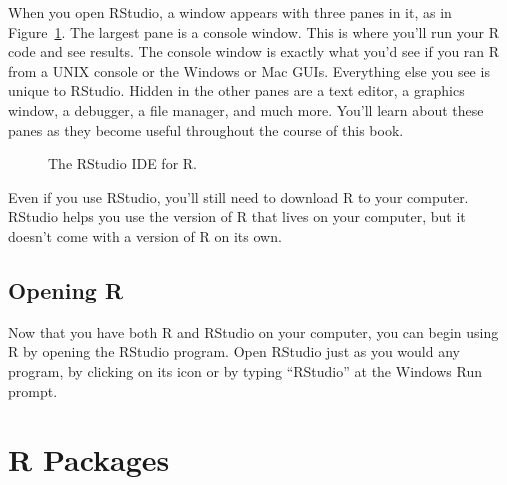 \documentclass[
  letterpaper,
  DIV=11,
  numbers=noendperiod]{scrbook}
\makeatletter
\newcommand*\pandocbounded[1]{%
  \sbox\pandoc@box{#1}%
  \Gscale@div\@tempa{\textheight}{\dimexpr\ht\pandoc@box+\dp\pandoc@box\relax}%
  \Gscale@div\@tempb{\linewidth}{\wd\pandoc@box}%
  \ifdim\@tempb\p@<\@tempa\p@\let\@tempa\@tempb\fi%
  \ifdim\@tempa\p@<\p@\scalebox{\@tempa}{\usebox\pandoc@box}%
  \else\usebox{\pandoc@box}%
  \fi%
}
\makeatother
\begin{document}
When you open RStudio, a window appears with three panes in it, as in
Figure~\ref{fig-layout}. The largest pane is a console window. This is
where you'll run your R code and see results. The console window is
exactly what you'd see if you ran R from a UNIX console or the Windows
or Mac GUIs. Everything else you see is unique to RStudio. Hidden in the
other panes are a text editor, a graphics window, a debugger, a file
manager, and much more. You'll learn about these panes as they become
useful throughout the course of this book.

\begin{figure}

\centering{

\pandocbounded{\texttt{[image: images/hopr\_aa01.png]}}

}

\caption{\label{fig-layout}The RStudio IDE for R.}

\end{figure}%

\begin{tcolorbox}[enhanced jigsaw, breakable, colback=white, colbacktitle=quarto-callout-tip-color!10!white, arc=.35mm, bottomrule=.15mm, coltitle=black, left=2mm, rightrule=.15mm, colframe=quarto-callout-tip-color-frame, leftrule=.75mm, opacitybacktitle=0.6, bottomtitle=1mm, toptitle=1mm, titlerule=0mm, opacityback=0, title=\textcolor{quarto-callout-tip-color}{\faLightbulb}\hspace{0.5em}{Do I still need to download R?}, toprule=.15mm]

Even if you use RStudio, you'll still need to download R to your
computer. RStudio helps you use the version of R that lives on your
computer, but it doesn't come with a version of R on its own.

\end{tcolorbox}

\section{Opening R}\label{opening-r}

Now that you have both R and RStudio on your computer, you can begin
using R by opening the RStudio program. Open RStudio just as you would
any program, by clicking on its icon or by typing ``RStudio'' at the
Windows Run prompt.

\chapter{R Packages}\label{sec-appendix-packages}
\end{document}
